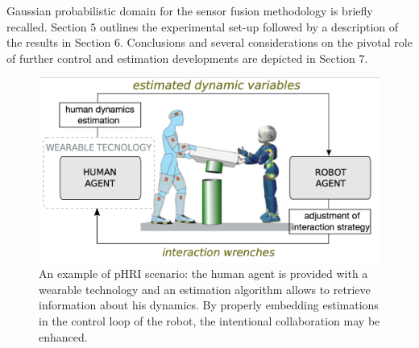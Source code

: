 Gaussian probabilistic domain for the sensor fusion methodology is briefly recalled.  Section $5$ outlines the 
experimental set-up followed by a description of the results in Section $6$.  
Conclusions and several considerations on the pivotal role of further control and 
estimation developments are depicted in Section $7$.
%	
\begin{figure}[ht]
  \centering
   \includegraphics[width=1\columnwidth]{figs/schemeFramework}
  \caption{An example of pHRI scenario: the human agent is provided with a wearable 
  technology and an estimation algorithm allows to retrieve information about his dynamics. 
  By properly embedding estimations in the control loop of the robot, the 
  intentional collaboration may be enhanced.}
  \label{fig:figs_schemeFrameworkLoop}
\end{figure}